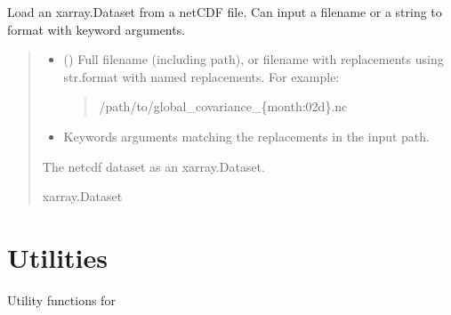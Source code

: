 \documentclass[letterpaper,10pt,english]{sphinxmanual}
\begin{document}
\begin{fulllineitems}
\label{\detokenize{misc:glomar_gridding.io.load_dataset}}
\pysigstartsignatures
\pysiglinewithargsret
{}
{\sphinxparamcomma {}}
{}
\pysigstopsignatures
\sphinxAtStartPar
Load an xarray.Dataset from a netCDF file. Can input a filename or a
string to format with keyword arguments.
\begin{quote}\begin{description}
\begin{itemize}
\item {}
\sphinxAtStartPar
{} () \textendash{}
\sphinxAtStartPar
Full filename (including path), or filename with replacements using
str.format with named replacements. For example:
\begin{quote}

\sphinxAtStartPar
/path/to/global\_covariance\_\{month:02d\}.nc
\end{quote}


\item {}
\sphinxAtStartPar
{} \textendash{} Keywords arguments matching the replacements in the input path.

\end{itemize}

\sphinxAtStartPar
{} \textendash{} The netcdf dataset as an xarray.Dataset.

\sphinxAtStartPar
xarray.Dataset

\end{description}\end{quote}

\end{fulllineitems}



\section{Utilities}
\label{\detokenize{misc:module-glomar_gridding.utils}}\label{\detokenize{misc:utilities}}
\sphinxAtStartPar
Utility functions for 
\end{document}
